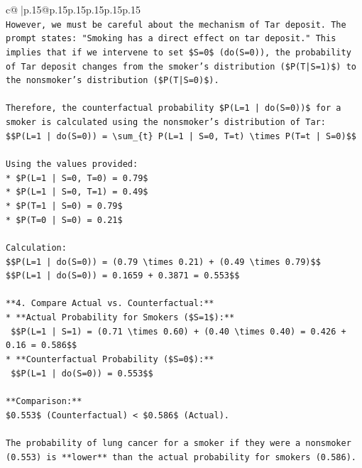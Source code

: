 \documentclass{article}
\begin{document}
{\begin{supertabular}{c@{$\;$}|p{.15\linewidth}@{}p{.15\linewidth}p{.15\linewidth}p{.15\linewidth}p{.15\linewidth}p{.15\linewidth}}
{{{\\ 
\texttt{However, we must be careful about the mechanism of Tar deposit. The prompt states: "Smoking has a direct effect on tar deposit." This implies that if we intervene to set \$S=0\$ (do(S=0)), the probability of Tar deposit changes from the smoker's distribution (\$P(T|S=1)\$) to the nonsmoker's distribution (\$P(T|S=0)\$).} \\
\\ 
\texttt{Therefore, the counterfactual probability \$P(L=1 | do(S=0))\$ for a smoker is calculated using the nonsmoker's distribution of Tar:} \\
\texttt{\$\$P(L=1 | do(S=0)) = \textbackslash{}sum\_\{t\} P(L=1 | S=0, T=t) \textbackslash{}times P(T=t | S=0)\$\$} \\
\\ 
\texttt{Using the values provided:} \\
\texttt{*   \$P(L=1 | S=0, T=0) = 0.79\$} \\
\texttt{*   \$P(L=1 | S=0, T=1) = 0.49\$} \\
\texttt{*   \$P(T=1 | S=0) = 0.79\$} \\
\texttt{*   \$P(T=0 | S=0) = 0.21\$} \\
\\ 
\texttt{Calculation:} \\
\texttt{\$\$P(L=1 | do(S=0)) = (0.79 \textbackslash{}times 0.21) + (0.49 \textbackslash{}times 0.79)\$\$} \\
\texttt{\$\$P(L=1 | do(S=0)) = 0.1659 + 0.3871 = 0.553\$\$} \\
\\ 
\texttt{**4. Compare Actual vs. Counterfactual:**} \\
\texttt{*   **Actual Probability for Smokers (\$S=1\$):**} \\
\texttt{    \$\$P(L=1 | S=1) = (0.71 \textbackslash{}times 0.60) + (0.40 \textbackslash{}times 0.40) = 0.426 + 0.16 = 0.586\$\$} \\
\texttt{*   **Counterfactual Probability (\$S=0\$):**} \\
\texttt{    \$\$P(L=1 | do(S=0)) = 0.553\$\$} \\
\\ 
\texttt{**Comparison:**} \\
\texttt{\$0.553\$ (Counterfactual) < \$0.586\$ (Actual).} \\
\\ 
\texttt{The probability of lung cancer for a smoker if they were a nonsmoker (0.553) is **lower** than the actual probability for smokers (0.586).} \\
}}}
\end{supertabular}}
\end{document}
